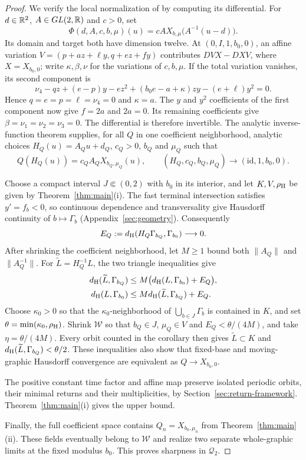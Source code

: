 \begin{proof}
We verify the local normalization of
\cite[Proposition~2.1]{DR2009} by computing its differential.
For $d\in\mathbb R^2$, $A\in GL(2,\mathbb R)$ and $c>0$, set
\[
 \Phi(d,A,c,b,\mu)(u)
   =cA X_{b,\mu}\bigl(A^{-1}(u-d)\bigr).
\]
Its domain and target both have dimension twelve. At
$(0,I,1,b_0,0)$, an affine variation
$V=(p+az+\ell y,q+ez+fy)$ contributes $DVX-DXV$, where
$X=X_{b_0,0}$; write $\kappa,\beta,\nu$ for the variations of
$c,b,\mu$. If the total variation vanishes, its second component is
\[
 \nu_4-qz+(e-p)y-ez^2+(b_0e-a+\kappa)zy-(e+\ell)y^2=0.
\]
Hence $q=e=p=\ell=\nu_4=0$ and $\kappa=a$.
The $y$ and $y^2$ coefficients of the first component now give
$f=2a$ and $2a=0$. Its remaining coefficients give
$\beta=\nu_1=\nu_2=\nu_3=0$. The differential is therefore
invertible. The analytic inverse-function theorem supplies, for all
$Q$ in one coefficient neighborhood, analytic choices
$H_Q(u)=A_Qu+d_Q$, $c_Q>0$, $b_Q$ and $\mu_Q$ such that
\[
 Q(H_Q(u))=c_QA_QX_{b_Q,\mu_Q}(u),\qquad
 (H_Q,c_Q,b_Q,\mu_Q)\longrightarrow(\mathrm{id},1,b_0,0).
\]

Choose a compact interval $J\Subset(0,2)$ with $b_0$ in its interior,
and let $K,V,\rho_{\rm H}$ be given by
Theorem~\ref{thm:main}(i). The fast terminal intersection satisfies
$y'=f_b<0$, so continuous dependence and transversality give
Hausdorff continuity of $b\mapsto\Gamma_b$
(Appendix~\ref{sec:geometry}). Consequently
\[
 E_Q:=d_{\rm H}(H_Q\Gamma_{b_Q},\Gamma_{b_0})\longrightarrow0.
\]
After shrinking the coefficient neighborhood, let $M\ge1$ bound
both $\|A_Q\|$ and $\|A_Q^{-1}\|$. For $\widetilde L=H_Q^{-1}L$,
the two triangle inequalities give
\begin{align*}
 d_{\rm H}(\widetilde L,\Gamma_{b_Q})
 &\le M\bigl(d_{\rm H}(L,\Gamma_{b_0})+E_Q\bigr),\\
 d_{\rm H}(L,\Gamma_{b_0})
 &\le M d_{\rm H}(\widetilde L,\Gamma_{b_Q})+E_Q.
\end{align*}
Choose $\kappa_0>0$ so that the $\kappa_0$-neighborhood of
$\bigcup_{b\in J}\Gamma_b$ is contained in $K$, and set
$\theta=\min(\kappa_0,\rho_{\rm H})$.
Shrink $\mathcal W$ so that $b_Q\in J$, $\mu_Q\in V$ and
$E_Q<\theta/(4M)$, and take $\eta=\theta/(4M)$.
Every orbit counted in the corollary then gives
$\widetilde L\subset K$ and
$d_{\rm H}(\widetilde L,\Gamma_{b_Q})<\theta/2$.
These inequalities also show that fixed-base and moving-graphic
Hausdorff convergence are equivalent as $Q\to X_{b_0,0}$.

The positive constant time factor and affine map preserve isolated
periodic orbits, their minimal returns and their multiplicities, by
Section~\ref{sec:return-framework}. Theorem~\ref{thm:main}(i) gives
the upper bound.

Finally, the full coefficient space contains
$Q_n=X_{b_0,\mu_n}$ from Theorem~\ref{thm:main}(ii). These fields
eventually belong to $\mathcal W$ and realize two separate
whole-graphic limits at the fixed modulus $b_0$.
This proves sharpness in $\mathcal Q_2$.
\end{proof}

